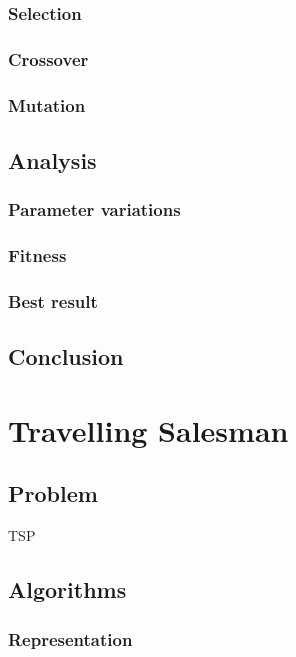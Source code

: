 \documentclass{scrartcl}
\begin{document}
\subsubsection{Selection}
\subsubsection{Crossover}
\subsubsection{Mutation}


\subsection{Analysis}

\subsubsection{Parameter variations}

\subsubsection{Fitness}

\subsubsection{Best result}

\subsection{Conclusion}



\section{Travelling Salesman}

\subsection{Problem}
TSP

\subsection{Algorithms}

\subsubsection{Representation}
\end{document}
